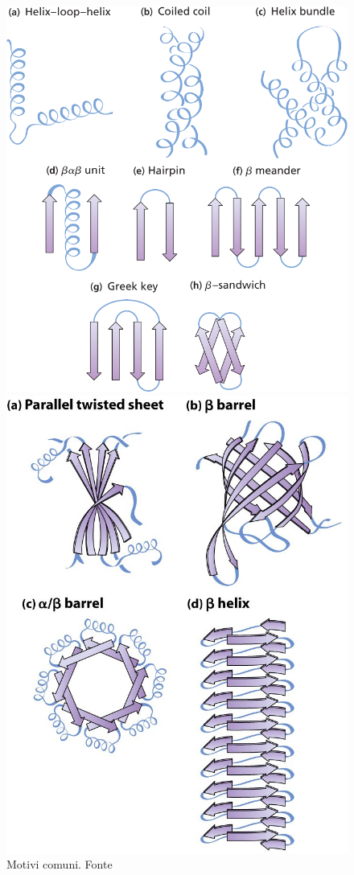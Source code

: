 {\begin{figure}[!htb]
	\centering
	\includegraphics[scale=0.4]{images/motivi-comuni.png}
	\caption{Motivi comuni. Fonte \cite{moran2012principles}}
	\label{fig:motivi-comuni}
	\endminipage\hfill
	\centering
	\includegraphics[scale=0.5]{images/domain-folds.jpg}

\end{figure}}
